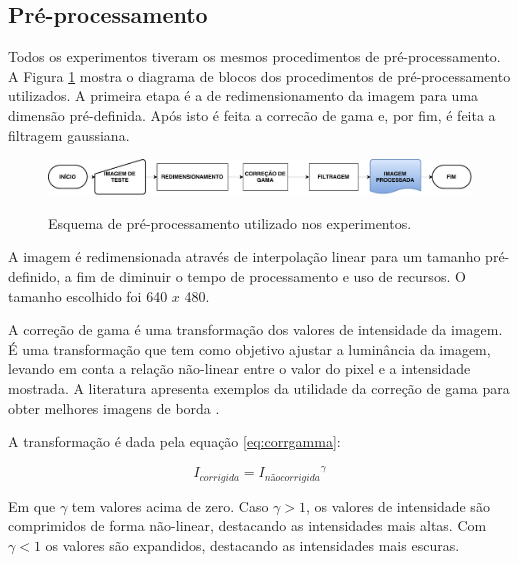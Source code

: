 \subsection{Pré-processamento} \label{exp:prep}


Todos os experimentos tiveram os mesmos procedimentos de pré-processamento. A Figura \ref{fig:diagpreproc} mostra o diagrama de blocos dos procedimentos de pré-processamento utilizados. A primeira etapa é a de redimensionamento da imagem para uma dimensão pré-definida. Após isto é feita a correcão de gama e, por fim, é feita a filtragem gaussiana.

\begin{figure} [h]
\centering
	\includegraphics[width = \textwidth]{figuras/preproc.pdf} \label{fig:diagpreproc} \caption{Esquema de pré-processamento utilizado nos experimentos.}
\end{figure}

A imagem é redimensionada através de interpolação linear para um tamanho pré-definido, a fim de diminuir o tempo de processamento e uso de recursos. O tamanho escolhido foi 640 $x$ 480.


A correção de gama é uma transformação dos valores de intensidade da imagem. É uma transformação que tem como objetivo ajustar a luminância da imagem, levando em conta a relação não-linear entre o valor do pixel e a intensidade mostrada. A literatura apresenta exemplos da utilidade da correção de gama para obter melhores imagens de borda \cite{corrgamma00,corrgamma01}.

A transformação é dada pela equação \ref{eq:corrgamma}:

\begin{equation}
I_{corrigida} = {I_{não corrigida}}^\gamma
\label{eq:corrgamma}
\end{equation}

Em que $\gamma$ tem valores acima de zero. Caso $\gamma >1$, os valores de intensidade são comprimidos de forma não-linear, destacando as intensidades mais altas. Com $\gamma <1$ os valores são expandidos, destacando as intensidades mais escuras.


